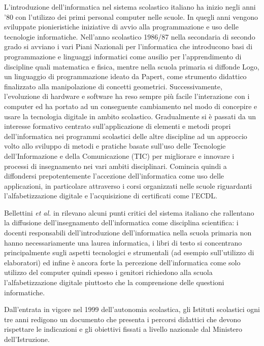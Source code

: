\documentclass[12pt]{report}
\begin{document}
L'introduzione dell'informatica nel sistema scolastico italiano ha inizio negli anni '80 con l’utilizzo dei primi personal computer nelle scuole. In quegli anni vengono sviluppate pionieristiche iniziative di avvio alla programmazione e uso delle tecnologie informatiche. Nell'anno scolastico 1986/87 nella secondaria di secondo grado si avviano i vari Piani Nazionali per l’informatica che introducono basi di programmazione e linguaggi informatici come ausilio per l'apprendimento di discipline quali matematica e fisica, mentre nella scuola primaria si diffonde Logo, un linguaggio di programmazione ideato da Papert, come strumento didattico finalizzato alla manipolazione di concetti geometrici.
Successivamente, l'evoluzione di hardware e software ha reso sempre più facile l'interazione con i computer ed ha portato ad un conseguente cambiamento nel modo di concepire e usare la tecnologia digitale in ambito scolastico. Gradualmente si è passati da un interesse formativo centrato sull'applicazione di elementi e metodi propri dell'informatica nei programmi scolastici delle altre discipline ad un approccio volto allo sviluppo di metodi e pratiche basate sull'uso delle Tecnologie dell'Informazione e della Comunicazione (TIC) per migliorare e innovare i processi di insegnamento nei vari ambiti disciplinari. Comincia quindi a diffondersi prepotentemente l'accezione dell'informatica come uso delle applicazioni, in particolare attraverso i corsi organizzati nelle scuole riguardanti l'alfabetizzazione digitale e l'acquisizione di certificati come l'ECDL.


Bellettini \textit{et al.} in \cite{BellettiniTOCE2014} rilevano alcuni punti critici del sistema italiano che rallentano la diffusione dell'insegnamento dell'informatica come disciplina scientifica: i docenti responsabili dell'introduzione dell'informatica nella scuola primaria non hanno necessariamente una laurea informatica, i libri di testo si concentrano principalmente sugli aspetti tecnologici e strumentali (ad esempio sull'utilizzo di elaboratori) ed infine è ancora forte la percezione dell'informatica come solo utilizzo del computer quindi spesso i genitori richiedono alla scuola l'alfabetizzazione digitale piuttosto che la comprensione delle questioni informatiche.

Dall'entrata in vigore nel 1999 dell'autonomia scolastica, gli Istituti scolastici ogni tre anni redigono un documento che presenta i percorsi didattici che devono rispettare le indicazioni e gli obiettivi fissati a livello nazionale dal Ministero dell'Istruzione. 
\end{document}
